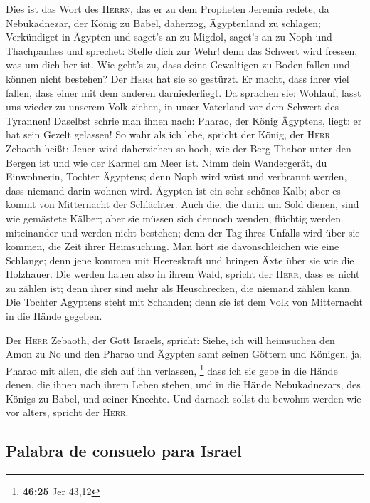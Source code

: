  Dies ist das Wort des \textsc{Herrn}, das er zu dem
Propheten Jeremia redete, da Nebukadnezar, der König zu Babel, daherzog,
Ägyptenland zu schlagen;  Verkündiget in Ägypten und
saget's an zu Migdol, saget's an zu Noph und Thachpanhes und sprechet:
Stelle dich zur Wehr! denn das Schwert wird fressen, was um dich her
ist.  Wie geht's zu, dass deine Gewaltigen zu Boden
fallen und können nicht bestehen? Der \textsc{Herr} hat sie so gestürzt.
 Er macht, dass ihrer viel fallen, dass einer mit dem
anderen darniederliegt. Da sprachen sie: Wohlauf, lasst uns wieder zu
unserem Volk ziehen, in unser Vaterland vor dem Schwert des Tyrannen!
 Daselbst schrie man ihnen nach: Pharao, der König
Ägyptens, liegt: er hat sein Gezelt gelassen!  So wahr
als ich lebe, spricht der König, der \textsc{Herr} Zebaoth heißt: Jener
wird daherziehen so hoch, wie der Berg Thabor unter den Bergen ist und
wie der Karmel am Meer ist.  Nimm dein Wandergerät, du
Einwohnerin, Tochter Ägyptens; denn Noph wird wüst und verbrannt werden,
dass niemand darin wohnen wird.  Ägypten ist ein sehr
schönes Kalb; aber es kommt von Mitternacht der Schlächter.
 Auch die, die darin um Sold dienen, sind wie gemästete
Kälber; aber sie müssen sich dennoch wenden, flüchtig werden miteinander
und werden nicht bestehen; denn der Tag ihres Unfalls wird über sie
kommen, die Zeit ihrer Heimsuchung.  Man hört sie
davonschleichen wie eine Schlange; denn jene kommen mit Heereskraft und
bringen Äxte über sie wie die Holzhauer.  Die werden
hauen also in ihrem Wald, spricht der \textsc{Herr}, dass es nicht zu
zählen ist; denn ihrer sind mehr als Heuschrecken, die niemand zählen
kann.  Die Tochter Ägyptens steht mit Schanden; denn sie
ist dem Volk von Mitternacht in die Hände gegeben.

 Der \textsc{Herr} Zebaoth, der Gott Israels, spricht:
Siehe, ich will heimsuchen den Amon zu No und den Pharao und Ägypten
samt seinen Göttern und Königen, ja, Pharao mit allen, die sich auf ihn
verlassen, \footnote{\textbf{46:25} Jer 43,12}  dass ich
sie gebe in die Hände denen, die ihnen nach ihrem Leben stehen, und in
die Hände Nebukadnezars, des Königs zu Babel, und seiner Knechte. Und
darnach sollst du bewohnt werden wie vor alters, spricht der
\textsc{Herr}.

\hypertarget{palabra-de-consuelo-para-israel}{%
\subsection{Palabra de consuelo para
Israel}\label{palabra-de-consuelo-para-israel}}

